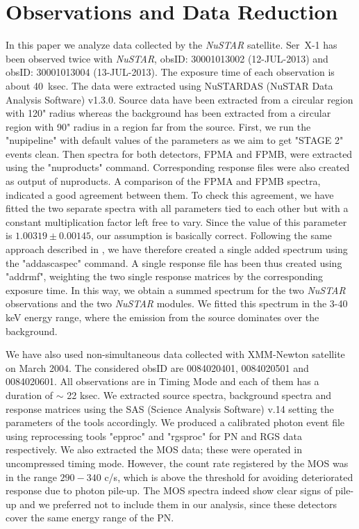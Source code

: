 \documentclass{aa}
\begin{document}
\section{Observations and Data Reduction}
\label{sec:reduc} 
In this paper we analyze data collected by the \emph{NuSTAR} 
satellite. Ser~X-1 has been observed twice with \emph{NuSTAR}, obsID: 
30001013002 (12-JUL-2013) and obsID: 30001013004 (13-JUL-2013). 
The exposure time of each observation is about 40~ksec. The data 
were extracted using NuSTARDAS (NuSTAR Data Analysis Software) v1.3.0. 
Source data have been extracted from a circular region with 120" 
radius whereas the background has been extracted from a circular 
region with 90" radius in a region far from the source. First, we 
run the "nupipeline" with default values of the parameters 
as we aim to get "STAGE 2" events clean. Then spectra for both 
detectors, FPMA and FPMB, were extracted using the "nuproducts" 
command. Corresponding response files were also created as output 
of nuproducts. A comparison of the FPMA and FPMB spectra, indicated 
a good agreement between them. To check this agreement, we 
have fitted the two separate spectra with all parameters tied to each 
other but with a constant multiplication factor left free to vary. 
Since the value of this parameter is $1.00319 \pm 0.00145$, our 
assumption is basically correct.
Following the same approach described in \citet{Miller.etal:13}, 
we have therefore created a single 
added spectrum using the "addascaspec" command. A single response 
file has been thus created using "addrmf", weighting the two 
single response matrices by the corresponding exposure time. In this way,
we obtain a summed spectrum for the two \emph{NuSTAR} observations 
and the two \emph{NuSTAR} modules. %
We fitted this spectrum in the 3-40 keV energy range, where the emission 
from the source dominates over the background. 

We have also used non-simultaneous data collected with XMM-Newton satellite 
on March 2004. The considered obsID are 0084020401, 0084020501  and 
0084020601. All observations are in Timing Mode and each of them has a 
duration of $\sim$ 22 ksec.
We extracted source spectra, background spectra and response 
matrices using the SAS (Science Analysis Software) v.14 setting the 
parameters of the tools accordingly. 
We produced a calibrated photon event file using reprocessing tools 
"epproc" and "rgsproc" for PN and RGS data respectively.
We also extracted the MOS data; these were operated in uncompressed timing 
mode. However, the count rate registered by the MOS was in the range 
$290-340$ c/s, which is above the threshold for avoiding deteriorated response 
due to photon pile-up. The MOS spectra indeed show clear signs of pile-up 
and we preferred not to include them in our analysis, since these detectors 
cover the same energy range of the PN.
\end{document}
